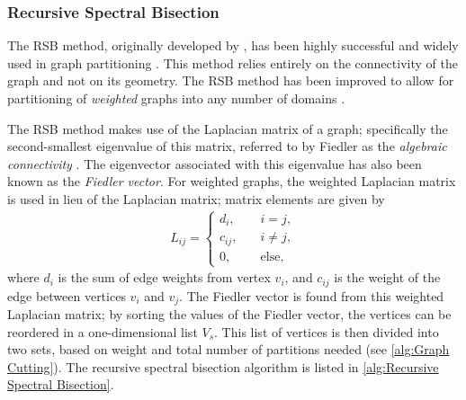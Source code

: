 {{{      \subsubsection{Recursive Spectral Bisection}{\label{sssec:Spatial Decomposition:Recursive Spectral Bisection}
        The \ac{RSB} method, originally developed by \citet{Pothen1989}, has been highly successful and widely used in graph partitioning \cite{Simon1991,Spielman2007}.
        This method relies entirely on the connectivity of the graph and not on its geometry.
        The \ac{RSB} method has been improved to allow for partitioning of \emph{weighted} graphs into any number of domains \cite{Hsieh1995}.

        The \ac{RSB} method makes use of the Laplacian matrix of a graph; specifically the second-smallest eigenvalue of this matrix, referred to by Fiedler as the \emph{algebraic connectivity} \cite{Fiedler1973}.
        The eigenvector associated with this eigenvalue has also been known as the \emph{Fiedler vector}.
        For weighted graphs, the weighted Laplacian matrix is used in lieu of the Laplacian matrix; matrix elements are given by
        \begin{align}
          \label{eq:Spatial Decomposition:Weighted Laplacian}
          L_{ij} =
            \begin{cases}
              d_i, \quad&{i=j},\\
              c_{ij}, \quad&{i\neq j},\\
              0, \quad&{\text{else}},
            \end{cases}
        \end{align}
        where $d_i$ is the sum of edge weights from vertex $v_i$, and $c_{ij}$ is the weight of the edge between vertices $v_i$ and $v_j$.
        The Fiedler vector is found from this weighted Laplacian matrix; by sorting the values of the Fiedler vector, the vertices can be reordered in a one-dimensional list $V_s$.
        This list of vertices is then divided into two sets, based on weight and total number of partitions needed (see \cref{alg:Graph Cutting}).
        The recursive spectral bisection algorithm is listed in \cref{alg:Recursive Spectral Bisection}.

}}}}
